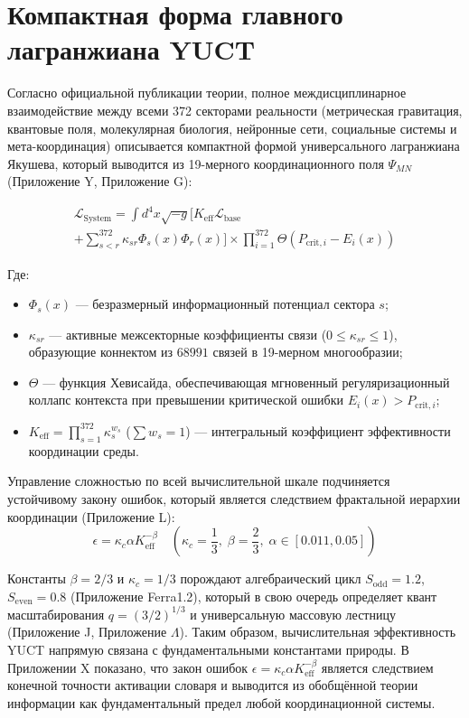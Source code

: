 \documentclass[12pt,a4paper]{article}
\begin{document}
	\section{Компактная форма главного лагранжиана YUCT}
	Согласно официальной публикации теории, полное междисциплинарное взаимодействие между всеми 372 секторами реальности (метрическая гравитация, квантовые поля, молекулярная биология, нейронные сети, социальные системы и мета-координация) описывается компактной формой универсального лагранжиана Якушева, который выводится из 19-мерного координационного поля \(\Psi_{MN}\) (Приложение Y, Приложение G):
	
	\begin{multline}
		\mathscr{L}_{\text{System}} = \int d^4x \sqrt{-g} \Bigg[ K_{\text{eff}} \mathscr{L}_{\text{base}} \\
		+ \sum_{s<r}^{372} \kappa_{sr} \Phi_s(x) \Phi_r(x) \Bigg] \times \prod_{i=1}^{372} \Theta(P_{\text{crit},i} - E_i(x))
	\end{multline}
	
	Где:
	\begin{itemize}
		\item \(\Phi_s(x)\) — безразмерный информационный потенциал сектора \(s\);
		\item \(\kappa_{sr}\) — активные межсекторные коэффициенты связи (\(0 \le \kappa_{sr} \le 1\)), образующие коннектом из \(68991\) связей в 19-мерном многообразии;
		\item \(\Theta\) — функция Хевисайда, обеспечивающая мгновенный регуляризационный коллапс контекста при превышении критической ошибки \(E_i(x) > P_{\text{crit},i}\);
		\item \(K_{\text{eff}} = \prod_{s=1}^{372} \kappa_s^{w_s}\) (\(\sum w_s = 1\)) — интегральный коэффициент эффективности координации среды.
	\end{itemize}
	
	Управление сложностью по всей вычислительной шкале подчиняется устойчивому закону ошибок, который является следствием фрактальной иерархии координации (Приложение L):
	\begin{equation}
		\epsilon = \kappa_c \alpha K_{\text{eff}}^{-\beta} \quad \left(\kappa_c = \frac{1}{3}, \; \beta = \frac{2}{3}, \; \alpha \in [0.011, 0.05]\right)
	\end{equation}
	
	Константы \(\beta = 2/3\) и \(\kappa_c = 1/3\) порождают алгебраический цикл \(S_{\mathrm{odd}} = 1.2\), \(S_{\mathrm{even}} = 0.8\) (Приложение Ferra1.2), который в свою очередь определяет квант масштабирования \(q = (3/2)^{1/3}\) и универсальную массовую лестницу (Приложение J, Приложение \(\Lambda\)). Таким образом, вычислительная эффективность YUCT напрямую связана с фундаментальными константами природы. В Приложении X показано, что закон ошибок \(\epsilon = \kappa_c\alpha K_{\mathrm{eff}}^{-\beta}\) является следствием конечной точности активации словаря и выводится из обобщённой теории информации как фундаментальный предел любой координационной системы.
	
\end{document}
